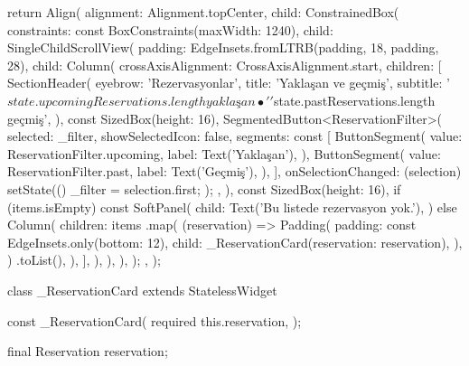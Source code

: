 \documentclass[11pt,a4paper]{article}
\begin{document}
\begin{codeblock}
{{{        return Align(
          alignment: Alignment.topCenter,
          child: ConstrainedBox(
            constraints: const BoxConstraints(maxWidth: 1240),
            child: SingleChildScrollView(
              padding: EdgeInsets.fromLTRB(padding, 18, padding, 28),
              child: Column(
                crossAxisAlignment: CrossAxisAlignment.start,
                children: [
                  SectionHeader(
                    eyebrow: 'Rezervasyonlar',
                    title: 'Yaklaşan ve geçmiş',
                    subtitle: '${state.upcomingReservations.length} yaklaşan • '
                        '${state.pastReservations.length} geçmiş',
                  ),
                  const SizedBox(height: 16),
                  SegmentedButton<ReservationFilter>(
                    selected: {_filter},
                    showSelectedIcon: false,
                    segments: const [
                      ButtonSegment(
                        value: ReservationFilter.upcoming,
                        label: Text('Yaklaşan'),
                      ),
                      ButtonSegment(
                        value: ReservationFilter.past,
                        label: Text('Geçmiş'),
                      ),
                    ],
                    onSelectionChanged: (selection) {
                      setState(() {
                        _filter = selection.first;
                      });
                    },
                  ),
                  const SizedBox(height: 16),
                  if (items.isEmpty)
                    const SoftPanel(
                      child: Text('Bu listede rezervasyon yok.'),
                    )
                  else
                    Column(
                      children: items
                          .map(
                            (reservation) => Padding(
                              padding: const EdgeInsets.only(bottom: 12),
                              child: _ReservationCard(reservation: reservation),
                            ),
                          )
                          .toList(),
                    ),
                ],
              ),
            ),
          ),
        );
      },
    );
  }
}

class _ReservationCard extends StatelessWidget {
  const _ReservationCard({
    required this.reservation,
  });

  final Reservation reservation;

}
\end{codeblock}
\end{document}
